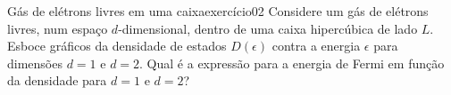 \begin{exercício}{Gás de elétrons livres em uma caixa}{exercício02}
    Considere um gás de elétrons livres, num espaço \(d\)-dimensional, dentro de uma caixa hipercúbica de lado \(L\). Esboce gráficos da densidade de estados \(D(\epsilon)\) contra a energia \(\epsilon\) para dimensões \(d = 1\) e \(d = 2\). Qual é a expressão para a energia de Fermi em função da densidade para \(d = 1\) e \(d = 2\)?
\end{exercício}
